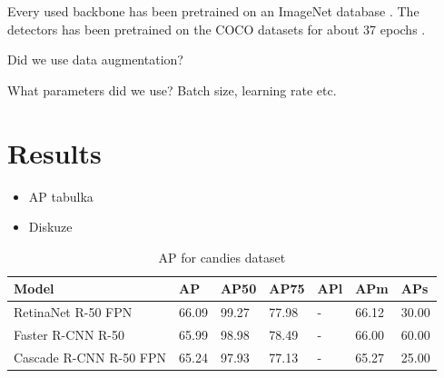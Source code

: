 Every used backbone has been pretrained on an ImageNet database \cite{imagenet}.
The detectors has been pretrained on the COCO datasets \cite{coco} for about
37 epochs \cite{detectron}.

Did we use data augmentation?

What parameters did we use? Batch size, learning rate etc.

\section{Results}
\begin{itemize}
	\item AP tabulka
	\item Diskuze
\end{itemize}

\begin{table}[h]
	\centering
	\begin{tabular}{l|l|l|l|l|l|l}
		Model                  & AP    & AP50  & AP75  & APl & APm   & APs   \\
		\hline
		RetinaNet R-50 FPN     & 66.09 & 99.27 & 77.98 & -   & 66.12 & 30.00 \\
		Faster R-CNN R-50      & 65.99 & 98.98 & 78.49 & -   & 66.00 & 60.00 \\
		Cascade R-CNN R-50 FPN & 65.24 & 97.93 & 77.13 & -   & 65.27 & 25.00
	\end{tabular}
	\caption{AP for candies dataset}
	\label{tab:candies}
\end{table}

